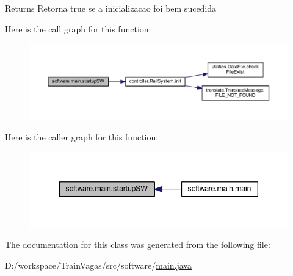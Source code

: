 \begin{DoxyReturn}{Returns}
Retorna true se a inicializacao foi bem sucedida 
\end{DoxyReturn}
Here is the call graph for this function\+:\nopagebreak
\begin{figure}[H]
\begin{center}
\leavevmode
\includegraphics[width=350pt]{classsoftware_1_1main_a704a81c9cf3d3fff3d223f49b9b98b67_cgraph}
\end{center}
\end{figure}
Here is the caller graph for this function\+:\nopagebreak
\begin{figure}[H]
\begin{center}
\leavevmode
\includegraphics[width=343pt]{classsoftware_1_1main_a704a81c9cf3d3fff3d223f49b9b98b67_icgraph}
\end{center}
\end{figure}


The documentation for this class was generated from the following file\+:\begin{DoxyCompactItemize}
\item 
D\+:/workspace/\+Train\+Vagas/src/software/\hyperlink{main_8java}{main.\+java}\end{DoxyCompactItemize}
